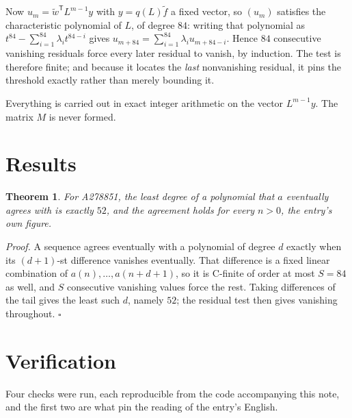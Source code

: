 \documentclass[11pt]{article}
\newtheorem{theorem}{Theorem}
\theoremstyle{definition}
\begin{document}
Now $u_m = \tilde w^{\mathsf T} L^{m-1} y$ with $y = q(L)\tilde f$ a fixed vector, so $(u_m)$ satisfies the characteristic polynomial of $L$, of degree $84$: writing that polynomial as $t^{84} - \sum_{i=1}^{84} \lambda_i t^{84-i}$ gives $u_{m+84} = \sum_{i=1}^{84} \lambda_i u_{m+84-i}$. Hence $84$ consecutive vanishing residuals force every later residual to vanish, by induction. The test is therefore finite; and because it locates the {\itshape last} nonvanishing residual, it pins the threshold exactly rather than merely bounding it.

Everything is carried out in exact integer arithmetic on the vector $L^{m-1}y$. The matrix $M$ is never formed.

\section{Results}

\begin{theorem} For A278851, the least degree of a polynomial that $a$ eventually agrees with is exactly $52$, and the agreement holds for every $n > 0$, the entry's own figure.\end{theorem}

{\itshape Proof.} A sequence agrees eventually with a polynomial of degree $d$ exactly when its $(d+1)$-st difference vanishes eventually. That difference is a fixed linear combination of $a(n),\dots,a(n+d+1)$, so it is C-finite of order at most $S = 84$ as well, and $S$ consecutive vanishing values force the rest. Taking differences of the tail gives the least such $d$, namely $52$; the residual test then gives vanishing throughout. $\square$

\section{Verification}

Four checks were run, each reproducible from the code accompanying this note, and the first two are what pin the reading of the entry's English.
\end{document}
